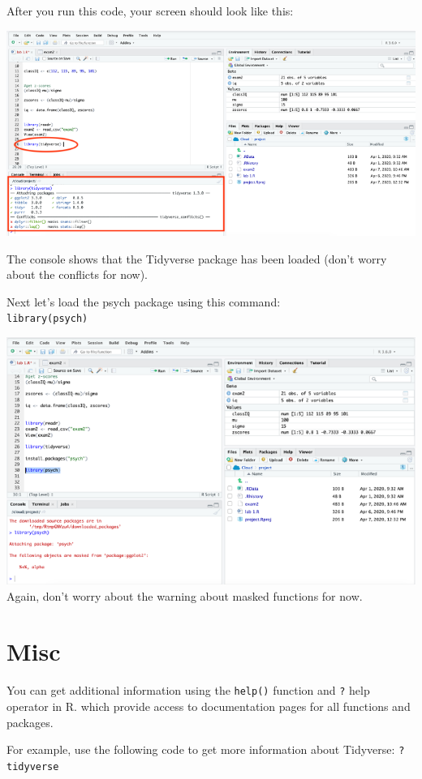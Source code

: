 \documentclass[
]{book}
\begin{document}
After you run this code, your screen should look like this:

\includegraphics{img/loadtidy.png}

The console shows that the Tidyverse package has been loaded (don't worry about the conflicts for now).

Next let's load the psych package using this command:\\
\texttt{library(psych)}

\includegraphics{img/loadpsyc.png}
Again, don't worry about the warning about masked functions for now.

\hypertarget{misc}{%
\section{Misc}\label{misc}}

You can get additional information using the \texttt{help()} function and \texttt{?} help operator in R. which provide access to documentation pages for all functions and packages.

For example, use the following code to get more information about Tidyverse:
\texttt{?tidyverse}
\end{document}
